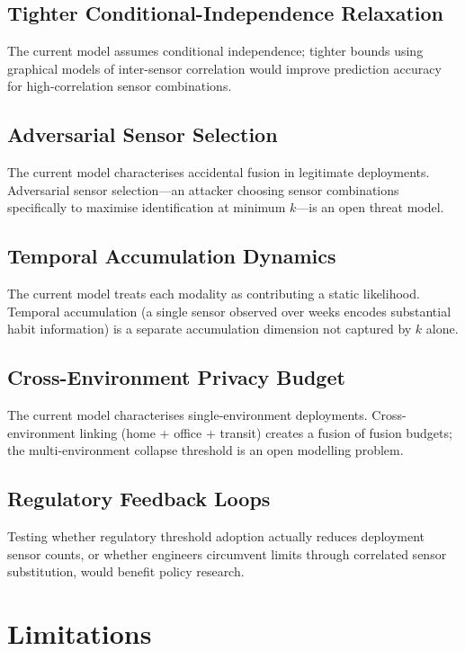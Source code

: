 \documentclass[sigconf,nonacm]{acmart}
\begin{document}
\subsection{Tighter Conditional-Independence Relaxation}

The current model assumes conditional independence; tighter
bounds using graphical models of inter-sensor correlation would
improve prediction accuracy for high-correlation sensor
combinations.

\subsection{Adversarial Sensor Selection}

The current model characterises accidental fusion in
legitimate deployments. Adversarial sensor selection---an
attacker choosing sensor combinations specifically to maximise
identification at minimum $k$---is an open threat model.

\subsection{Temporal Accumulation Dynamics}

The current model treats each modality as contributing a
static likelihood. Temporal accumulation (a single sensor
observed over weeks encodes substantial habit information) is
a separate accumulation dimension not captured by $k$ alone.

\subsection{Cross-Environment Privacy Budget}

The current model characterises single-environment deployments.
Cross-environment linking (home + office + transit) creates a
fusion of fusion budgets; the multi-environment collapse
threshold is an open modelling problem.

\subsection{Regulatory Feedback Loops}

Testing whether regulatory threshold adoption actually reduces
deployment sensor counts, or whether engineers circumvent
limits through correlated sensor substitution, would benefit
policy research.

\section{Limitations}
\end{document}
